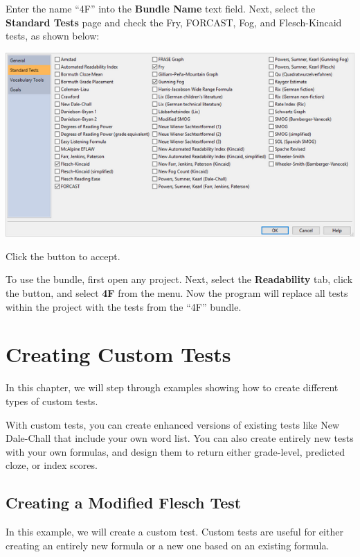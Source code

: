 \documentclass[
]{book}
\theoremstyle{definition}
\theoremstyle{definition}
\theoremstyle{definition}
\theoremstyle{definition}
\theoremstyle{remark}
\begin{document}
Enter the name ``4F'' into the \textbf{Bundle Name} text field. Next, select the \textbf{Standard Tests} page and check the Fry, FORCAST, Fog, and Flesch-Kincaid tests, as shown below:

\includegraphics{Images/TestBundle4F.png}

Click the  button to accept.

To use the bundle, first open any project. Next, select the \textbf{Readability} tab, click the  button, and select \textbf{4F} from the menu. Now the program will replace all tests within the project with the tests from the ``4F'' bundle.

\hypertarget{creating-custom-tests}{%
\chapter{Creating Custom Tests}\label{creating-custom-tests}}

In this chapter, we will step through examples showing how to create different types of custom tests.

With custom tests, you can create enhanced versions of existing tests like New Dale-Chall that include your own word list. You can also create entirely new tests with your own formulas, and design them to return either grade-level, predicted cloze, or index scores.

\hypertarget{creating-custom-flesch-test}{%
\section{\texorpdfstring{Creating a Modified Flesch Test}{Creating a Modified Flesch Test}}\label{creating-custom-flesch-test}}

In this example, we will create a custom test. Custom tests are useful for either creating an entirely new formula or a new one based on an existing formula.
\end{document}
